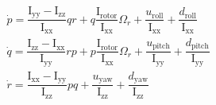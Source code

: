 \documentclass[3p,times]{elsarticle}
\begin{document}
\begin{align}
    &\dot p = \dfrac{\mathrm{I}_{\text{yy}} - \mathrm{I}_{\text{zz}}}{\mathrm{I}_{\text{xx}}} qr + q \dfrac{\mathrm{I}_{\text{rotor}}}{\mathrm{I}_{\text{xx}}}\Omega_r + \dfrac{u_{\text{roll}}}{\mathrm{I}_{\text{xx}}} + \dfrac{d_{\text{roll}}}{\mathrm{I}_{\text{xx}}}
    \\
&\dot q = \dfrac{\mathrm{I}_{\text{zz}} - \mathrm{I}_{\text{xx}}}{\mathrm{I}_{\text{yy}}} rp + p \dfrac{\mathrm{I}_{\text{rotor}}}{\mathrm{I}_{\text{xx}}}\Omega_r + \dfrac{u_{\text{pitch}}}{\mathrm{I}_{\text{yy}}} + \dfrac{d_{\text{pitch}}}{\mathrm{I}_{\text{yy}}}
\\
&\dot r = \dfrac{\mathrm{I}_{\text{xx}} - \mathrm{I}_{\text{yy}}}{\mathrm{I}_{\text{zz}}} pq  +  \dfrac{u_{\text{yaw}}}{\mathrm{I}_{\text{zz}}} + \dfrac{d_{\text{yaw}}}{\mathrm{I}_{\text{zz}}}
\end{align}
\end{document}
